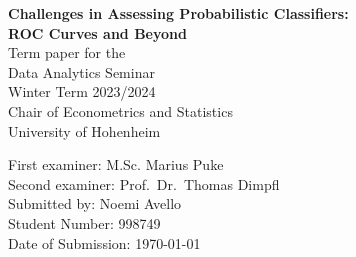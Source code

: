\documentclass[a4paper,12pt]{article}
\numberwithin{equation}{section}
\begin{document}
\onehalfspacing

%
%



\begin{titlepage}       

\thispagestyle{empty}   

\begin{center}
   \vspace*{2.5cm}
   {\bf  \Large Challenges in Assessing Probabilistic Classifiers: \\ROC Curves and Beyond} \\
   \vspace*{3cm} 
   Term paper for the \\ Data Analytics Seminar\\ Winter Term 2023/2024\\
   Chair of Econometrics and Statistics\\ 
   University of Hohenheim
   \end{center}


\vfill

\hfill \begin{minipage}{0.5\linewidth}
 First examiner: M.Sc. Marius Puke \\
 Second examiner: Prof.\ Dr.\ Thomas Dimpfl \\
 
 Submitted by: Noemi Avello \\
 Student Number: 998749 \\
 
 Date of Submission: \today 
\end{minipage}


\end{titlepage}

\newpage                 
\end{document}
